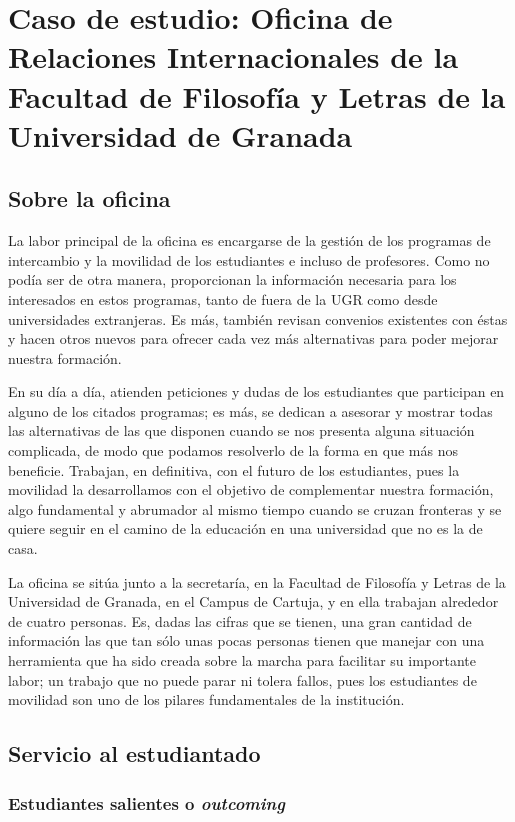 \section{Caso de estudio: Oficina de Relaciones Internacionales de la Facultad de Filosofía y Letras de la Universidad de Granada}
\subsection{Sobre la oficina}
La labor principal de la oficina es encargarse de la gestión de los programas de intercambio y la movilidad de los estudiantes e incluso de profesores. Como no podía ser de otra manera, proporcionan la información necesaria para los interesados en estos programas, tanto de fuera de la UGR como desde universidades extranjeras. Es más, también revisan convenios existentes con éstas y hacen otros nuevos para ofrecer cada vez más alternativas para poder mejorar nuestra formación.

En su día a día, atienden peticiones y dudas de los estudiantes que participan en alguno de los citados programas; es más, se dedican a asesorar y mostrar todas las alternativas de las que disponen cuando se nos presenta alguna situación complicada, de modo que podamos resolverlo de la forma en que más nos beneficie. Trabajan, en definitiva, con el futuro de los estudiantes, pues la movilidad la desarrollamos con el objetivo de complementar nuestra formación, algo fundamental y abrumador al mismo tiempo cuando se cruzan fronteras y se quiere seguir en el camino de la educación en una universidad que no es la de casa.

La oficina se sitúa junto a la secretaría, en la Facultad de Filosofía y Letras de la Universidad de Granada, en el Campus de Cartuja, y en ella trabajan alrededor de cuatro personas. Es, dadas las cifras que se tienen, una gran cantidad de información las que tan sólo unas pocas personas tienen que manejar con una herramienta que ha sido creada sobre la marcha para facilitar su importante labor; un trabajo que no puede parar ni tolera fallos, pues los estudiantes de movilidad son uno de los pilares fundamentales de la institución.

\subsection{Servicio al estudiantado}
\subsubsection{Estudiantes salientes o \textit{outcoming}}

